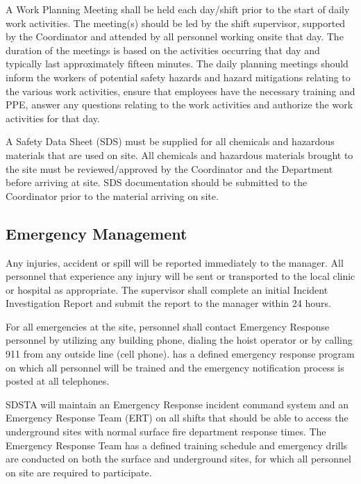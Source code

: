 A Work Planning Meeting shall be held each day/shift prior to the
start of daily work activities. The meeting(s) should be led by the
shift supervisor, supported by the   Coordinator and
attended by all personnel working onsite that day. The duration of
the meetings is based on the activities occurring that day and
typically last approximately fifteen minutes. The daily planning
meetings should inform the workers of potential safety hazards and
hazard mitigations relating to the various work activities, ensure
that employees have the necessary  training and PPE, answer any
questions relating to the work activities and authorize the work
activities for that day.

A Safety Data Sheet (SDS) must be supplied for all chemicals and
hazardous materials that are used on site. All chemicals and hazardous
materials brought to the  site must be reviewed/approved by the
  Coordinator and the  
Department before arriving at site.  SDS documentation should be
submitted to the   Coordinator prior to the
material arriving on site.

\subsection{Emergency Management}

Any injuries, accident or spill will be reported immediately to the
  manager. All personnel that
experience any injury will be sent or transported to the local clinic
or hospital as appropriate.  The supervisor shall complete an initial
Incident Investigation Report and submit the report to the
  manager within 24 hours.

For all emergencies at the  site, personnel shall contact
Emergency Response personnel by utilizing any building phone, dialing
the hoist operator or by calling 911 from any outside line (cell
phone).   has a defined emergency response program on which all
personnel will be trained and the emergency notification process is
posted at all telephones.

SDSTA will maintain an Emergency Response incident command system and
an Emergency Response Team (ERT) on all shifts that should be able to
access the underground sites with normal surface fire department
response times. The Emergency Response Team has a defined training
schedule and emergency drills are conducted on both the surface and
underground sites, for which all personnel on site are required to
participate.


